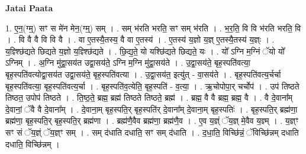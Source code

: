 \documentclass[17pt]{extarticle}
\begin{document}
\textbf{Jatai Paata} \newline

1. ए॒न॒(ग्म्॒) सꣳ स मे॑न मेन॒(ग्म्॒) सम् । . सम् भ॑रति भरति॒ सꣳ सम् भ॑रति । . भ॒र॒ति॒ वि वि भ॑रति भरति॒ वि । . वि वै वै वि वि वै । . वा ए॒तस्यै॒तस्य॒ वै वा ए॒तस्य॑ । . ए॒तस्य॑ य॒ज्ञो य॒ज्ञ् ए॒तस्यै॒तस्य॑ य॒ज्ञ्ः । . य॒ज्ञ्श्छि॑द्यते छिद्यते य॒ज्ञो य॒ज्ञ्श्छि॑द्यते । . छि॒द्य॒ते॒ यो यश्छि॑द्यते छिद्यते॒ यः । . यो᳚ ऽग्नि म॒ग्निं ॅयो यो᳚ ऽग्निम् । . अ॒ग्नि मु॑द्वा॒सय॑त उद्वा॒सय॑ते॒ ऽग्नि म॒ग्नि मु॑द्वा॒सय॑ते । . उ॒द्वा॒सय॑ते॒ बृह॒स्पति॑वत्या॒ बृह॒स्पति॑वत्योद्वा॒सय॑त उद्वा॒सय॑ते॒ बृह॒स्पति॑वत्या । . उ॒द्वा॒सय॑त॒ इत्यु॑त् - वा॒सय॑ते । . बृह॒स्पति॑वत्य॒र्चर्चा बृह॒स्पति॑वत्या॒ बृह॒स्पति॑वत्य॒र्चा । . बृह॒स्पति॑व॒त्येति॒ बृह॒स्पति॑ - व॒त्या॒ । . ऋ॒चोपोपा॒र् चर्चोप॑ । . उप॑ तिष्ठते तिष्ठत॒ उपोप॑ तिष्ठते । . ति॒ष्ठ॒ते॒ ब्रह्म॒ ब्रह्म॑ तिष्ठते तिष्ठते॒ ब्रह्म॑ । . ब्रह्म॒ वै वै ब्रह्म॒ ब्रह्म॒ वै । . वै दे॒वाना᳚म् दे॒वानां॒ ॅवै वै दे॒वाना᳚म् । . दे॒वाना॒म् बृह॒स्पति॒र् बृह॒स्पति॑र् दे॒वाना᳚म् दे॒वाना॒म् बृह॒स्पतिः॑ । . बृह॒स्पति॒र् ब्रह्म॑णा॒ ब्रह्म॑णा॒ बृह॒स्पति॒र् बृह॒स्पति॒र् ब्रह्म॑णा । . ब्रह्म॑णै॒वैव ब्रह्म॑णा॒ ब्रह्म॑णै॒व । . ए॒व य॒ज्ञ्ं ॅय॒ज्ञ् मे॒वैव य॒ज्ञ्म् । . य॒ज्ञ्ꣳ सꣳ सं ॅय॒ज्ञ्ं ॅय॒ज्ञ्ꣳ सम् । . सम् द॑धाति दधाति॒ सꣳ सम् द॑धाति । . द॒धा॒ति॒ विच्छि॑न्नं॒ ॅविच्छि॑न्नम् दधाति दधाति॒ विच्छि॑न्नम् । \newline
\end{document}
